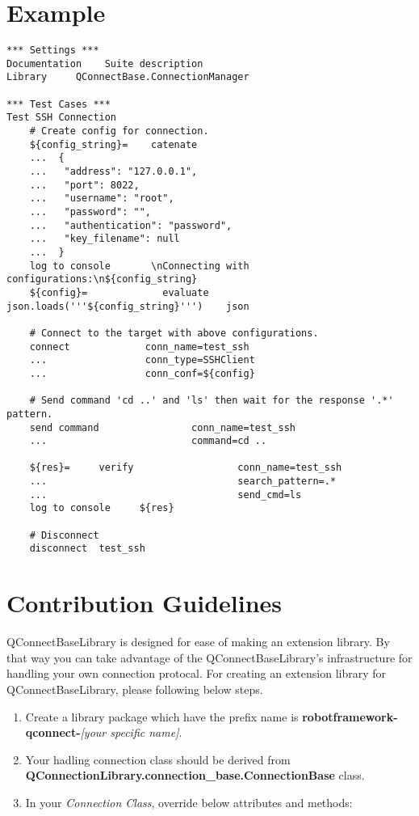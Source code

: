 \hypertarget{description-example}{%
\section{Example}\label{description-example}}

\begin{verbatim}
*** Settings ***
Documentation    Suite description
Library     QConnectBase.ConnectionManager

*** Test Cases ***
Test SSH Connection
    # Create config for connection.
    ${config_string}=    catenate
    ...  {
    ...   "address": "127.0.0.1",
    ...   "port": 8022,
    ...   "username": "root",
    ...   "password": "",
    ...   "authentication": "password",
    ...   "key_filename": null
    ...  }
    log to console       \nConnecting with configurations:\n${config_string}
    ${config}=             evaluate        json.loads('''${config_string}''')    json

    # Connect to the target with above configurations.
    connect             conn_name=test_ssh
    ...                 conn_type=SSHClient
    ...                 conn_conf=${config}

    # Send command 'cd ..' and 'ls' then wait for the response '.*' pattern.
    send command                conn_name=test_ssh
    ...                         command=cd ..

    ${res}=     verify                  conn_name=test_ssh
    ...                                 search_pattern=.*
    ...                                 send_cmd=ls
    log to console     ${res}

    # Disconnect
    disconnect  test_ssh
\end{verbatim}

\hypertarget{description-contribution-guidelines}{%
\section{Contribution Guidelines}\label{description-contribution-guidelines}}

QConnectBaseLibrary is designed for ease of making an extension library.
By that way you can take advantage of the QConnectBaseLibrary's
infrastructure for handling your own connection protocal. For creating
an extension library for QConnectBaseLibrary, please following below
steps.

\begin{enumerate}
\def\labelenumi{\arabic{enumi}.}
\tightlist
\item
  Create a library package which have the prefix name is
  \textbf{robotframework-qconnect-}\emph{{[}your specific name{]}}.
\item
  Your hadling connection class should be derived from
  \textbf{QConnectionLibrary.connection\_base.ConnectionBase} class.
\item
  In your \emph{Connection Class}, override below attributes and
  methods:
\end{enumerate}

